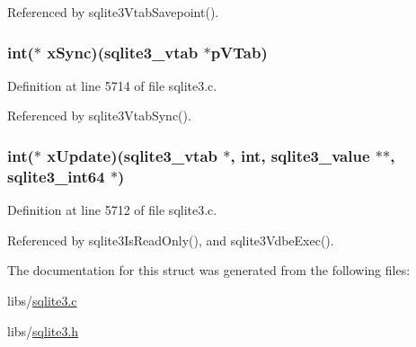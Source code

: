 Referenced by sqlite3\+Vtab\+Savepoint().

\hypertarget{structsqlite3__module_af9a8f4d899e9398f60338ba6bb4c1388}{}
\subsubsection[{x\+Sync}]{\setlength{\rightskip}{0pt plus 5cm}int($\ast$ x\+Sync)({\bf sqlite3\+\_\+vtab} $\ast$p\+V\+Tab)}\label{structsqlite3__module_af9a8f4d899e9398f60338ba6bb4c1388}


Definition at line 5714 of file sqlite3.\+c.



Referenced by sqlite3\+Vtab\+Sync().

\hypertarget{structsqlite3__module_a8ce76e9030b77e5c57f1c056462bfe53}{}
\subsubsection[{x\+Update}]{\setlength{\rightskip}{0pt plus 5cm}int($\ast$ x\+Update)({\bf sqlite3\+\_\+vtab} $\ast$, int, sqlite3\+\_\+value $\ast$$\ast$, {\bf sqlite3\+\_\+int64} $\ast$)}\label{structsqlite3__module_a8ce76e9030b77e5c57f1c056462bfe53}


Definition at line 5712 of file sqlite3.\+c.



Referenced by sqlite3\+Is\+Read\+Only(), and sqlite3\+Vdbe\+Exec().



The documentation for this struct was generated from the following files\+:\begin{DoxyCompactItemize}
\item 
libs/\hyperlink{sqlite3_8c}{sqlite3.\+c}\item 
libs/\hyperlink{sqlite3_8h}{sqlite3.\+h}\end{DoxyCompactItemize}
